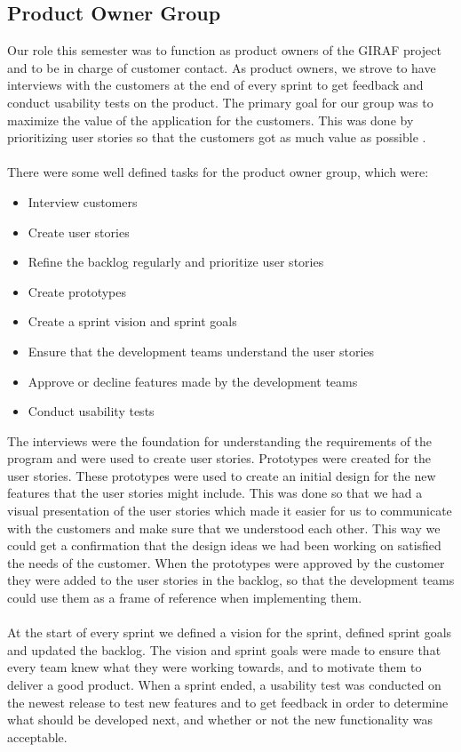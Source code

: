\subsection{Product Owner Group}
Our role this semester was to function as product owners of the GIRAF project and to be in charge of customer contact. 
As product owners, we strove to have interviews with the customers at the end of every sprint to get feedback and conduct usability tests on the product.
The primary goal for our group was to maximize the value of the application for the customers. 
This was done by prioritizing user stories so that the customers got as much value as possible \autocite{TheScrumGuide}.\\
\\
There were some well defined tasks for the product owner group, which were:
\begin{itemize}
    \item Interview customers
    \item Create user stories    
    \item Refine the backlog regularly and prioritize user stories
    \item Create prototypes
    \item Create a sprint vision and sprint goals
    \item Ensure that the development teams understand the user stories
    \item Approve or decline features made by the development teams
    \item Conduct usability tests
\end{itemize}
\noindent
The interviews were the foundation for understanding the requirements of the program and were used to create user stories. 
Prototypes were created for the user stories.
These prototypes were used to create an initial design for the new features that the user stories might include. 
This was done so that we had a visual presentation of the user stories which made it easier for us to communicate with the customers and make sure that we understood each other. 
This way we could get a confirmation that the design ideas we had been working on satisfied the needs of the customer.
When the prototypes were approved by the customer they were added to the user stories in the backlog, so that the development teams could use them as a frame of reference when implementing them.
\\\\
At the start of every sprint we defined a vision for the sprint, defined sprint goals and updated the backlog. 
The vision and sprint goals were made to ensure that every team knew what they were working towards, and to motivate them to deliver a good product.
When a sprint ended, a usability test was conducted on the newest release to test new features and to get feedback in order to determine what should be developed next, and whether or not the new functionality was acceptable.



